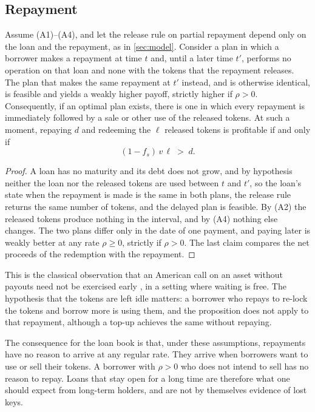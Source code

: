 \subsection{Repayment}

\begin{proposition}\label{prop:repay}
Assume (A1)--(A4), and let the release rule on partial repayment depend only on the loan and the repayment, as in \cref{sec:model}. Consider a plan in which a borrower makes a repayment at time $t$ and, until a later time $t'$, performs no operation on that loan and none with the tokens that the repayment releases. The plan that makes the same repayment at $t'$ instead, and is otherwise identical, is feasible and yields a weakly higher payoff, strictly higher if $\rho>0$. Consequently, if an optimal plan exists, there is one in which every repayment is immediately followed by a sale or other use of the released tokens. At such a moment, repaying $d$ and redeeming the $\ell$ released tokens is profitable if and only if
\begin{equation}\label{eq:close}
(1-f_s)\,v\,\ell\;>\;d .
\end{equation}
\end{proposition}
\begin{proof}
A loan has no maturity and its debt does not grow, and by hypothesis neither the loan nor the released tokens are used between $t$ and $t'$, so the loan's state when the repayment is made is the same in both plans, the release rule returns the same number of tokens, and the delayed plan is feasible. By (A2) the released tokens produce nothing in the interval, and by (A4) nothing else changes. The two plans differ only in the date of one payment, and paying later is weakly better at any rate $\rho\ge0$, strictly if $\rho>0$. The last claim compares the net proceeds of the redemption with the repayment.
\end{proof}

This is the classical observation that an American call on an asset without payouts need not be exercised early \citep{merton1973}, in a setting where waiting is free. The hypothesis that the tokens are left idle matters: a borrower who repays to re-lock the tokens and borrow more is using them, and the proposition does not apply to that repayment, although a top-up achieves the same without repaying.

The consequence for the loan book is that, under these assumptions, repayments have no reason to arrive at any regular rate. They arrive when borrowers want to use or sell their tokens. A borrower with $\rho>0$ who does not intend to sell has no reason to repay. Loans that stay open for a long time are therefore what one should expect from long-term holders, and are not by themselves evidence of lost keys.

